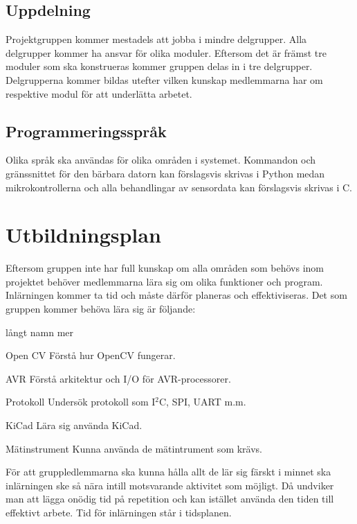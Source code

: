 \documentclass[projektplan/plan.tex]{subfiles}
\begin{document}
\subsection{Uppdelning}
Projektgruppen kommer mestadels att jobba i mindre delgrupper. Alla delgrupper
kommer ha ansvar för olika moduler. Eftersom det är främst tre moduler som ska
konstrueras kommer gruppen delas in i tre delgrupper. Delgrupperna kommer
bildas utefter vilken kunskap medlemmarna har om respektive modul för att
underlätta arbetet.

\subsection{Programmeringsspråk}
Olika språk ska användas för olika områden i systemet. Kommandon och
gränssnittet för den bärbara datorn kan förslagsvis skrivas i Python medan
mikrokontrollerna och alla behandlingar av sensordata kan förslagsvis skrivas i
C.

\newpage
\section{Utbildningsplan}
\noindent
Eftersom gruppen inte har full kunskap om alla områden som behövs inom
projektet behöver medlemmarna lära sig om olika funktioner och program.
Inlärningen kommer ta tid och måste därför planeras och effektiviseras. Det som
gruppen kommer behöva lära sig är följande:
\begin{labeling}{långt namn mer}
    \item[Open CV] Förstå hur OpenCV fungerar.
    \item[AVR] Förstå arkitektur och I/O för
    AVR-processorer.
    \item[Protokoll] Undersök protokoll som
    I$^2$C, SPI, UART m.m.
    \item[KiCad] Lära sig använda KiCad.
    \item[Mätinstrument] Kunna använda de mätintrument som krävs.
\end{labeling}
För att gruppledlemmarna ska kunna hålla allt de lär sig färskt i minnet ska
inlärningen ske så nära intill motsvarande aktivitet som möjligt. Då undviker
man att lägga onödig tid på repetition och kan istället använda den tiden till
effektivt arbete. Tid för inlärningen står i tidsplanen.
\end{document}
